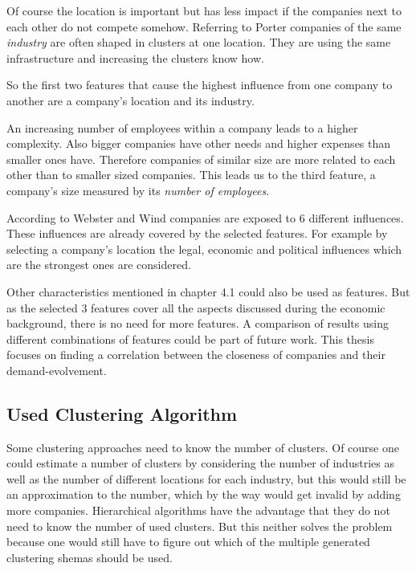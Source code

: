 Of course the location is important but has less impact if the companies next to each other do not compete somehow.
Referring to Porter \cite{CompanyClusters} companies of the same \emph{industry} are often shaped in clusters at one location.
They are using the same infrastructure and increasing the clusters know how.

So the first two features that cause the highest influence from one company to another are a company's location and its industry.

An increasing number of employees within a company leads to a higher complexity. Also bigger companies have other needs and higher expenses than
smaller ones have. Therefore companies of similar size are more related to each other than to smaller sized companies.
This leads us to the third feature, a company's size measured by its \emph{number of employees}.

According to Webster and Wind \cite{BusinessBuyingBehavior} companies are exposed to 6 different influences. These influences are already covered
by the selected features. For example by selecting a company's location the legal, economic and political influences which
are the strongest ones are considered.

Other characteristics mentioned in chapter 4.1 could also be used as features. But as the selected 3 features cover all the aspects
discussed during the economic background, there is no need for more features. A comparison of results using different combinations of
features could be part of future work. This thesis focuses on finding a correlation between the closeness of companies and their
demand-evolvement.

\subsection{Used Clustering Algorithm}

Some clustering approaches need to know the number of clusters. Of course one could estimate a number of clusters
by considering the number of industries as well as the number of different locations for each industry, but this would
still be an approximation to the number, which by the way would get invalid by adding more companies.
Hierarchical algorithms have the advantage that they do not need to know the number of used clusters. But this neither
solves the problem because one would still have to figure out which of the multiple generated clustering shemas
should be used.

